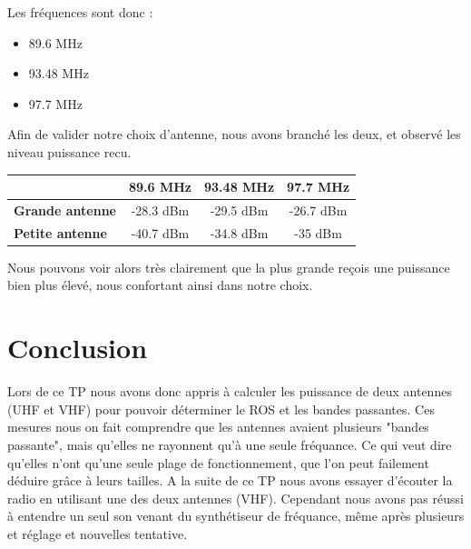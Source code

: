 \documentclass[a4paper,12pt]{report}            %
\begin{document}
Les fréquences sont donc :
\begin{itemize}
	\item 89.6 MHz
	\item 93.48 MHz
	\item 97.7 MHz
\end{itemize}

Afin de valider notre choix d'antenne, nous avons branché les deux, et observé les niveau puissance
recu.

\begin{center}
	\begin{tabular}{||p{4cm}||*{3}{c|}|}
		\hline
		\bfseries                & 89.6 MHz  & 93.48 MHz & 97.7 MHz  \\
		\hline
		\hline
		\bfseries Grande antenne & -28.3 dBm & -29.5 dBm & -26.7 dBm \\
		\hline
		\bfseries Petite antenne & -40.7 dBm & -34.8 dBm & -35 dBm   \\
		\hline
		\hline
	\end{tabular}
\end{center}

Nous pouvons voir alors très clairement que la plus grande reçois une puissance bien plus élevé,
nous confortant ainsi dans notre choix.

\chapter{Conclusion}

    Lors de ce TP nous avons donc appris à calculer les puissance de deux antennes (UHF et VHF) pour pouvoir déterminer
le ROS et les bandes passantes. Ces mesures nous on fait comprendre que les antennes avaient plusieurs "bandes passante", 
mais qu'elles ne rayonnent qu'à une seule fréquance. Ce qui veut dire qu'elles n'ont qu'une seule plage de fonctionnement,
que l'on peut failement déduire grâce à leurs tailles. A la suite de ce TP nous avons essayer d'écouter la radio en utilisant
une des deux antennes (VHF). Cependant nous avons pas réussi à entendre un seul son venant du synthétiseur de fréquance, même  
après plusieurs et réglage et nouvelles tentative.
\end{document}
